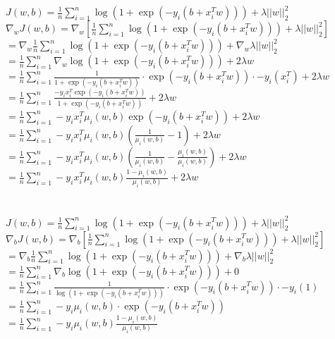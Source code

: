 \documentclass{article}
\newcommand{\1}{\mathbf{1}}
\begin{document}
{$J(w,b) = \frac{1}{n} \sum_{i=1}^n \log( 1 + \exp(-y_i (b + x_i^T w))) + \lambda ||w||_2^2$ \\
$\nabla_w J(w,b) = \nabla_w [\frac{1}{n} \sum_{i=1}^n \log( 1 + \exp(-y_i (b + x_i^T w))) + \lambda ||w||_2^2]$ \\ 
$ = \nabla_w \frac{1}{n} \sum_{i=1}^n \log( 1 + \exp(-y_i (b + x_i^T w))) + \nabla_w \lambda ||w||_2^2$ \\ 
$ = \frac{1}{n} \sum_{i=1}^n \nabla_w \log( 1 + \exp(-y_i (b + x_i^T w))) + 2 \lambda w$ \\ 
$ = \frac{1}{n} \sum_{i=1}^n \frac{1}{1 + \exp(-y_i (b + x_i^T w))} \cdot \exp(-y_i (b + x_i^T w)) \cdot -y_i (x_i^T) + 2 \lambda w$ \\ 
$ = \frac{1}{n} \sum_{i=1}^n \frac{-y_i x_i^T \exp(-y_i (b + x_i^T w))}{1 + \exp(-y_i (b + x_i^T w))} + 2 \lambda w$ \\ 
$ = \frac{1}{n} \sum_{i=1}^n -y_i x_i^T \mu_i(w, b) \exp(-y_i (b + x_i^T w)) + 2 \lambda w$ \\ 
$ = \frac{1}{n} \sum_{i=1}^n -y_i x_i^T \mu_i(w, b) (\frac{1}{\mu_i(w, b)} - 1) + 2 \lambda w$ \\ 
$ = \frac{1}{n} \sum_{i=1}^n -y_i x_i^T \mu_i(w, b) (\frac{1}{\mu_i(w, b)} - \frac{\mu_i(w, b)}{\mu_i(w, b)}) + 2 \lambda w$ \\ 
$ = \frac{1}{n} \sum_{i=1}^n -y_i x_i^T \mu_i(w, b) \frac{1 - \mu_i(w, b)}{\mu_i(w, b)} + 2 \lambda w$ \\ 
 \\ \\
$J(w,b) = \frac{1}{n} \sum_{i=1}^n \log( 1 + \exp(-y_i (b + x_i^T w))) + \lambda ||w||_2^2$ \\
$\nabla_{b} J(w,b) = \nabla_{b} [\frac{1}{n} \sum_{i=1}^n \log( 1 + \exp(-y_i (b + x_i^T w))) + \lambda ||w||_2^2]$ \\
$ = \nabla_{b} \frac{1}{n} \sum_{i=1}^n \log( 1 + \exp(-y_i (b + x_i^T w))) + \nabla_{b} \lambda ||w||_2^2$ \\ 
$ = \frac{1}{n} \sum_{i=1}^n \nabla_{b} \log( 1 + \exp(-y_i (b + x_i^T w))) + 0$ \\ 
$ = \frac{1}{n} \sum_{i=1}^n \frac{1}{\log( 1 + \exp(-y_i (b + x_i^T w)))} \cdot \exp(-y_i (b + x_i^T w)) \cdot -y_i(1)$ \\ 
$ = \frac{1}{n} \sum_{i=1}^n -y_i \mu_i(w, b) \cdot \exp(-y_i (b + x_i^T w))$ \\ 
$ = \frac{1}{n} \sum_{i=1}^n -y_i \mu_i(w, b) \frac{1 - \mu_i(w, b)}{\mu_i(w, b)}$ \\ 

}
\end{document}
